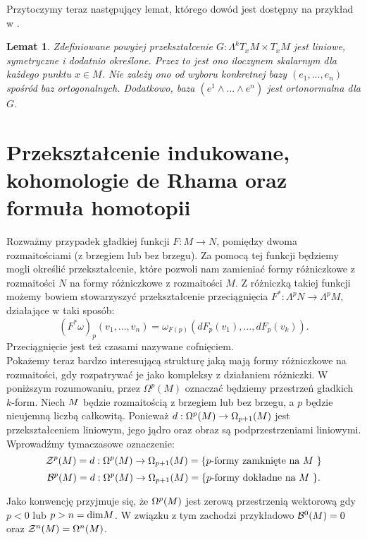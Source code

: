 \documentclass[licencjacka]{pracamgr}
\theoremstyle{definition}
\theoremstyle{definition}
\theoremstyle{plain}
\newtheorem{lemma}{Lemat}[section]
\theoremstyle{plain}
\def\M{\ensuremath M}
\begin{document}
Przytoczymy teraz następujący lemat, którego dowód jest dostępny na przykład
 w \cite{lausanne}.

\begin{lemma}
    Zdefiniowane powyżej przekształcenie $G: \Lambda^k T_x M \times T_x M $ 
    jest liniowe, symetryczne i dodatnio określone. Przez to jest ono iloczynem
    skalarnym dla każdego punktu $x \in M$.  Nie zależy ono od wyboru konkretnej bazy
    $(e_1, ..., e_n)$ spośród baz ortogonalnych.  Dodatkowo, baza
    $(e^1 \wedge ... \wedge e^n)$ jest ortonormalna dla $G$.
\end{lemma}



\section{Przekształcenie indukowane, kohomologie de Rhama oraz formuła homotopii}
Rozważmy przypadek gładkiej funkcji $F: M \rightarrow N$, pomiędzy
dwoma rozmaitościami (z brzegiem lub bez brzegu). Za pomocą tej
funkcji będziemy mogli określić przekształcenie, które pozwoli nam
zamieniać formy różniczkowe z rozmaitości $N$ na formy różniczkowe z
rozmaitości $M$. Z różniczką takiej funkcji możemy bowiem stowarzyszyć
przekształcenie
przeciągnięcia $F^\ast: \Lambda^p N \rightarrow \Lambda^p M$, działające w taki sposób:
\[
    (F^\ast \omega)_p(v_1, ..., v_n) =
        \omega_{F(p)}(dF_p(v_1), ..., dF_p(v_k)).
\] Przeciągnięcie jest też czasami nazywane cofnięciem. \\


Pokażemy teraz bardzo interesującą strukturę jaką mają formy różniczkowe
na rozmaitości, gdy rozpatrywać je jako kompleksy z działaniem różniczki.
W poniższym rozumowaniu, przez $\Omega^p (M)$ oznaczać będziemy
przestrzeń gładkich $k$-form.  Niech $\M$ będzie rozmaitością z
brzegiem lub bez brzegu, a $p$ będzie nieujemną liczbą całkowitą.
Ponieważ $d: \Omega^p (\M ) \rightarrow \Omega_{p+1}(\M) $ jest
przekształceniem liniowym, jego jądro oraz obraz są podprzestrzeniami
liniowymi. Wprowadźmy tymaczasowe oznaczenie:
\[
\mathcal{Z}^p ( \M ) =
d: \Omega^{p} (\M ) \rightarrow \Omega_{p+1}(\M) =
\{\text{$p$-formy zamknięte na $\M$ } \}
\]
\[
\mathcal{B}^p ( \M ) =
d: \Omega^{p} (\M ) \rightarrow \Omega_{p+1}(\M) =
\{\text{$p$-formy dokładne na $\M$ } \}.
\]

Jako konwencję przyjmuje się, że $\Omega^{p} ( \M ) $ jest zerową
przestrzenią wektorową gdy $p < 0$ lub $p > n = \text{dim} \M $. W
związku z tym zachodzi przykładowo $\mathcal{B}^0(\M)=0$ oraz
$\mathcal{Z}^n(\M)= \Omega^n(\M)$. \\
\end{document}
